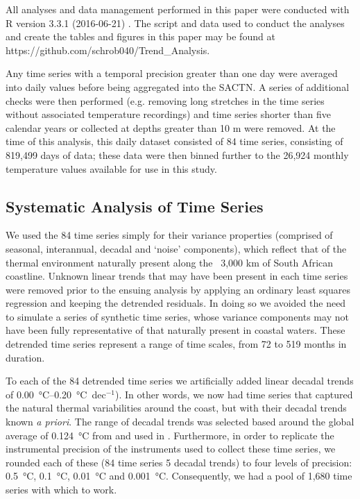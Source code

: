 \documentclass{ametsoc}
\begin{document}
All analyses and data management performed in this paper were conducted with R version 3.3.1 (2016-06-21) \citep{R}. The script and data used to conduct the analyses and create the tables and figures in this paper may be found at https://github.com/schrob040/Trend_Analysis.

Any time series with a temporal precision greater than one day were averaged into daily values before being aggregated into the SACTN. A series of additional checks were then performed (e.g. removing long stretches in the time series without associated temperature recordings) and time series shorter than five calendar years or collected at depths greater than 10 m were removed. At the time of this analysis, this daily dataset consisted of 84 time series, consisting of 819,499 days of data; these data were then binned further to the 26,924 monthly temperature values available for use in this study.

\subsection{Systematic Analysis of Time Series}
We used the 84 time series simply for their variance properties (comprised of seasonal, interannual, decadal and ‘noise’ components), which reflect that of the thermal environment naturally present along the ~3,000 km of South African coastline. Unknown linear trends that may have been present in each time series were removed prior to the ensuing analysis by applying an ordinary least squares regression and keeping the detrended residuals. In doing so we avoided the need to simulate a series of synthetic time series, whose variance components may not have been fully representative of that naturally present in coastal waters. These detrended time series represent a range of time scales, from 72 to 519 months in duration.

To each of the 84 detrended time series we artificially added linear decadal trends of \SIrange{0.00}{0.20}{\degreeCelsius}~dec$^{-1}$). In other words, we now had time series that captured the natural thermal variabilities around the coast, but with their decadal trends known \emph{a priori}. The range of decadal trends was selected based around the global average of \SI{0.124}{\degreeCelsius} from \citet{Kennedy2011} and used in \citet{IPCC2013}. Furthermore, in order to replicate the instrumental precision of the instruments used to collect these time series, we rounded each of these (84 time series \texttimes{} 5 decadal trends) to four levels of precision: \SI{0.5}{\degreeCelsius}, \SI{0.1}{\degreeCelsius}, \SI{0.01}{\degreeCelsius} and \SI{0.001}{\degreeCelsius}. Consequently, we had a pool of 1,680 time series with which to work.
\end{document}
